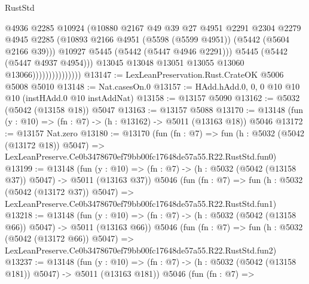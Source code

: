 \begin{lexlean}{RustStd}
\begin{coremodule}
                                    @4936
                                    @2285
                                    @10924
                                    (@10880
                                      @2167
                                      @49
                                      @39
                                      @27
                                      @4951
                                      @2291
                                      @2304
                                      @2279
                                      @4945
                                      @2285
                                      (@10893
                                        @2166
                                        @4951
                                        (@5598 (@5599 @4951))
                                        (@5442 (@5604 @2166 @39)))
                                      @10927
                                      @5445
                                      (@5442 (@5447 @4946 @2291)))
                                    @5445
                                    (@5442 (@5447 @4937 @4954)))
                                  @13045
                                  @13048
                                  @13051
                                  @13055
                                  @13060
                                  @13066)))))))))))))))
@13147 := LexLeanPreservation.Rust.CrateOK @5006 @5008 @5010
@13148 := Nat.casesOn.{0}
@13157 := HAdd.hAdd.{0, 0, 0} @10 @10 @10 (instHAdd.{0} @10 instAddNat)
@13158 := @13157 @5090
@13162 := @5032 (@5042 (@13158 @18)) @5047
@13163 := @13157 @5088
@13170 := @13148 (fun (y : @10) => (fn : @7) -> (h : @13162) -> @5011 (@13163 @18)) @5046
@13172 := @13157 Nat.zero
@13180 := @13170
    (fun (fn : @7) =>
    fun (h : @5032 (@5042 (@13172 @18)) @5047) =>
    LexLeanPreserve.Ce0b3478670ef79bb00fc17648de57a55.R22.RustStd.fun0)
@13199 := @13148
    (fun (y : @10) => (fn : @7) -> (h : @5032 (@5042 (@13158 @37)) @5047) -> @5011 (@13163 @37))
    @5046
    (fun (fn : @7) =>
    fun (h : @5032 (@5042 (@13172 @37)) @5047) =>
    LexLeanPreserve.Ce0b3478670ef79bb00fc17648de57a55.R22.RustStd.fun1)
@13218 := @13148
    (fun (y : @10) => (fn : @7) -> (h : @5032 (@5042 (@13158 @66)) @5047) -> @5011 (@13163 @66))
    @5046
    (fun (fn : @7) =>
    fun (h : @5032 (@5042 (@13172 @66)) @5047) =>
    LexLeanPreserve.Ce0b3478670ef79bb00fc17648de57a55.R22.RustStd.fun2)
@13237 := @13148
    (fun (y : @10) => (fn : @7) -> (h : @5032 (@5042 (@13158 @181)) @5047) -> @5011 (@13163 @181))
    @5046
    (fun (fn : @7) =>

\end{coremodule}
\end{lexlean}
